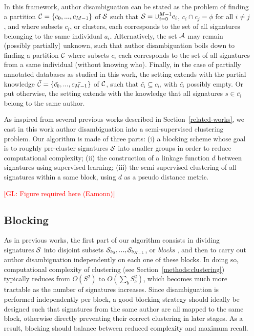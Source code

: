 \documentclass{article}
\newcommand{\glnote}[1]{\textcolor{red}{[GL: #1]}}
\begin{document}
In this
framework, author disambiguation can be stated as the problem of
finding a partition ${\cal C} = \{ c_0, ..., c_{M-1} \}$ of ${\cal S}$ such
that ${\cal S} = \cup_{i=0}^{M-1} c_i$, $c_i \cap c_j = \phi$ for all $i \neq
j$, and where subsets $c_i$, or clusters, each corresponds to the set of all
signatures belonging to the same individual $a_i$. Alternatively, the set
${\cal A}$ may remain (possibly partially) unknown, such that author
disambiguation boils down to finding a partition ${\cal C}$ where
subsets $c_i$  each corresponds to the set of all signatures from a same
individual (without knowing who). Finally, in the case of partially annotated databases as studied in
this work, the setting extends with the partial knowledge $\bar{{\cal C}} = \{ \bar{c_0}, ..., \bar{c_{M-1}} \}$ of ${\cal C}$,
such that $\bar{c_i} \subseteq c_i$, with $\bar{c_i}$ possibly empty.
Or put otherwise, the setting extends with the knowledge that all signatures
$s \in \bar{c_i}$ belong to the same author.

As inspired from several previous works described in Section~\ref{related-works},
we cast in this work author disambiguation into a semi-supervised clustering
problem.  Our algorithm is made of three parts: (i) a blocking
scheme whose goal is to roughly pre-cluster signatures ${\cal S}$ into smaller groups in order to
reduce computational complexity; (ii) the construction of a linkage function
$d$ between signatures using supervised learning; (iii) the
semi-supervised clustering of all signatures within a same block, using $d$ as a pseudo distance metric.

\glnote{Figure required here (Eamonn)}

\subsection{Blocking}
\label{methods:blocking}

As in previous works, the first part of our algorithm consists in dividing
signatures ${\cal S}$ into disjoint subsets ${\cal S}_{b_0}, ..., {\cal
S}_{b_{K-1}}$, or \textit{blocks} \citep{fellegi69}, and then to carry out
author disambiguation independently on each one of these blocks. In doing so,
computational complexity of clustering (see Section~\ref{methods:clustering})
typically reduces from $O(S^2)$ to $O(\sum_b S_b^2)$, which becomes much more
tractable as the number of signatures increases. Since disambiguation is
performed independently per block, a good blocking strategy should ideally be
designed such that signatures from the same author are all mapped to the same
block, otherwise directly preventing their correct clustering in later stages. As a
result, blocking should balance between reduced complexity and maximum recall.
\end{document}
